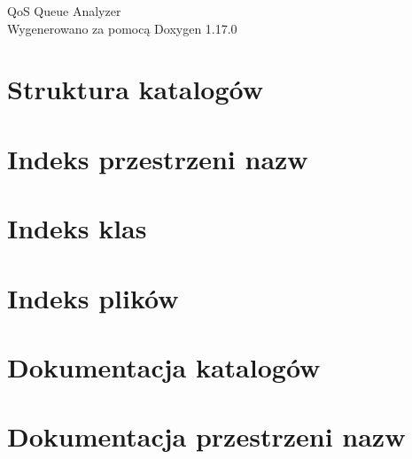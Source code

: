\documentclass[twoside]{book}
\newcommand{\+}{\discretionary{\mbox{\scriptsize$\hookleftarrow$}}{}{}}
\newcommand{\clearemptydoublepage}{%
    \newpage{\pagestyle{empty}\cleardoublepage}%
  }
\begin{document}
  \raggedbottom
    \hypersetup{pageanchor=false,
                bookmarksnumbered=true,
                pdfencoding=unicode
               }
  \begin{titlepage}
  \vspace*{7cm}
  \begin{center}%
  {\Large Qo\+S Queue Analyzer}\\
  \vspace*{1cm}
  {\large Wygenerowano za pomocą Doxygen 1.17.0}\\
  \end{center}
  \end{titlepage}
  \clearemptydoublepage
  \tableofcontents
  \clearemptydoublepage
  \hypersetup{pageanchor=true}

\chapter{Struktura katalogów}

\chapter{Indeks przestrzeni nazw}

\chapter{Indeks klas}

\chapter{Indeks plików}

\chapter{Dokumentacja katalogów}








\chapter{Dokumentacja przestrzeni nazw}

\end{document}
